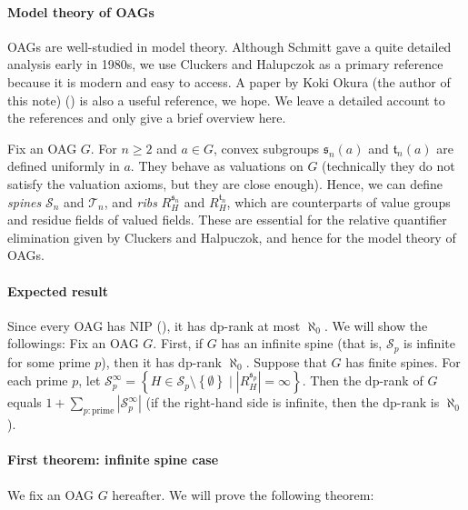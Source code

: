 \documentclass{article}
\theoremstyle{definition}
\theoremstyle{remark}
\theoremstyle{plain}
\begin{document}
\paragraph{Model theory of OAGs}

OAGs are well-studied in model theory.
Although Schmitt \cite{Schmitt1982ModThe} gave a quite detailed analysis early in 1980s, we use Cluckers and Halupczok \cite{Cluckers2011QuaEli} as a primary reference because it is modern and easy to access.
A paper by Koki Okura (the author of this note) (\cite{Okura2026DisOrd}) is also a useful reference, we hope.
We leave a detailed account to the references and only give a brief overview here.

Fix an OAG $G$.
For $n \geq 2$ and $a \in G$, convex subgroups $\mathfrak{s}_n(a)$ and $\mathfrak{t}_n(a)$ are defined uniformly in $a$.
They behave as valuations on $G$ (technically they do not satisfy the valuation axioms, but they are close enough).
Hence, we can define \emph{spines} $\mathcal{S}_n$ and $\mathcal{T}_n$, and \emph{ribs} $R_H^{\mathfrak{s}_n}$ and $R_H^{\mathfrak{t}_n}$, which are counterparts of value groups and residue fields of valued fields.
These are essential for the relative quantifier elimination given by Cluckers and Halpuczok, and hence for the model theory of OAGs.

\paragraph{Expected result}

Since every OAG has NIP (\cite{Gurevich1984TheOrd}), it has dp-rank at most $\aleph_0$.
We will show the followings:
Fix an OAG $G$.
First, if $G$ has an infinite spine (that is, $\mathcal{S}_p$ is infinite for some prime $p$), then it has dp-rank $\aleph_0$.
Suppose that $G$ has finite spines.
For each prime $p$, let $\mathcal{S}_p^{\infty} = \left\{ H \in \mathcal{S}_p \setminus \left\{ \emptyset \right\} \mid \left| R_H^{\mathfrak{s}_p} \right| = \infty \right\}$.
Then the dp-rank of $G$ equals $1 + \sum_{p: \text{prime}} \left| \mathcal{S}_p^{\infty} \right|$ (if the right-hand side is infinite, then the dp-rank is $\aleph_0$).

\paragraph{First theorem: infinite spine case}

We fix an OAG $G$ hereafter.
We will prove the following theorem:
\end{document}
